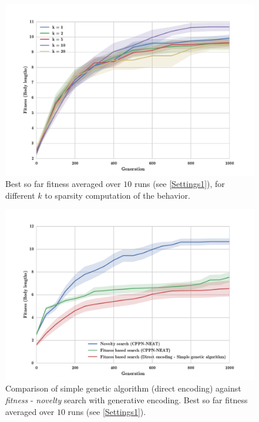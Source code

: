 \begin{figure}
\centering
\includegraphics[width=1.0\textwidth]{../Figures/Results/KnnExperimentSize5.pdf}
\caption{Best so far fitness averaged over $10$ runs (see \ref{Settings1}), for different $k$ to sparsity computation of the behavior.}
\label{fig:KnnExperimentSize5}
\end{figure}

\begin{figure}[h!]
\centering
\includegraphics[width=1.0\textwidth]{../Figures/Results/FitvsNovVsDirSize5.pdf}
\caption{Comparison of simple genetic algorithm (direct encoding) against \emph{fitness} - \emph{novelty} search with generative encoding. Best so far fitness averaged over $10$ runs (see \ref{Settings1}).}
\label{fig:FitvsNovVsDirSize5}
\end{figure}


